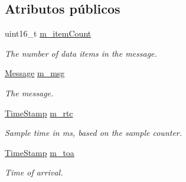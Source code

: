 \subsection*{\-Atributos públicos}
\begin{DoxyCompactItemize}
\item 
\hypertarget{classxsens_1_1Packet_a3701903c9b0c53ccf4746065a56ea1cd}{uint16\-\_\-t \hyperlink{classxsens_1_1Packet_a3701903c9b0c53ccf4746065a56ea1cd}{m\-\_\-item\-Count}}\label{classxsens_1_1Packet_a3701903c9b0c53ccf4746065a56ea1cd}

\begin{DoxyCompactList}\small\item\em \-The number of data items in the message. \end{DoxyCompactList}\item 
\hypertarget{classxsens_1_1Packet_a47e7ac871245ab85bb24234601c4a556}{\hyperlink{classxsens_1_1Message}{\-Message} \hyperlink{classxsens_1_1Packet_a47e7ac871245ab85bb24234601c4a556}{m\-\_\-msg}}\label{classxsens_1_1Packet_a47e7ac871245ab85bb24234601c4a556}

\begin{DoxyCompactList}\small\item\em \-The message. \end{DoxyCompactList}\item 
\hypertarget{classxsens_1_1Packet_a63333f071389d061783f6c3282941ef6}{\hyperlink{namespacexsens_a2679efcfb1565882c6aa789096f8878e}{\-Time\-Stamp} \hyperlink{classxsens_1_1Packet_a63333f071389d061783f6c3282941ef6}{m\-\_\-rtc}}\label{classxsens_1_1Packet_a63333f071389d061783f6c3282941ef6}

\begin{DoxyCompactList}\small\item\em \-Sample time in ms, based on the sample counter. \end{DoxyCompactList}\item 
\hypertarget{classxsens_1_1Packet_a1afa3dcbce14718d669fe38c9c50b041}{\hyperlink{namespacexsens_a2679efcfb1565882c6aa789096f8878e}{\-Time\-Stamp} \hyperlink{classxsens_1_1Packet_a1afa3dcbce14718d669fe38c9c50b041}{m\-\_\-toa}}\label{classxsens_1_1Packet_a1afa3dcbce14718d669fe38c9c50b041}

\begin{DoxyCompactList}\small\item\em \-Time of arrival. \end{DoxyCompactList}\end{DoxyCompactItemize}
